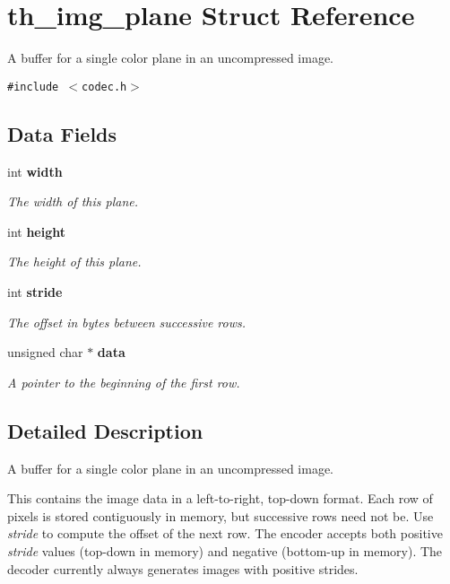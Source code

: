 \section{th\_\-img\_\-plane Struct Reference}
\label{structth__img__plane}
A buffer for a single color plane in an uncompressed image.  


{\tt \#include $<$codec.h$>$}

\subsection*{Data Fields}
\begin{CompactItemize}
\item 
int \bf{width}
\begin{CompactList}\small\item\em The width of this plane. \item\end{CompactList}\item 
int \bf{height}
\begin{CompactList}\small\item\em The height of this plane. \item\end{CompactList}\item 
int \bf{stride}
\begin{CompactList}\small\item\em The offset in bytes between successive rows. \item\end{CompactList}\item 
unsigned char $\ast$ \bf{data}
\begin{CompactList}\small\item\em A pointer to the beginning of the first row. \item\end{CompactList}\end{CompactItemize}


\subsection{Detailed Description}
A buffer for a single color plane in an uncompressed image. 

This contains the image data in a left-to-right, top-down format. Each row of pixels is stored contiguously in memory, but successive rows need not be. Use {\em stride\/} to compute the offset of the next row. The encoder accepts both positive {\em stride\/} values (top-down in memory) and negative (bottom-up in memory). The decoder currently always generates images with positive strides. 



